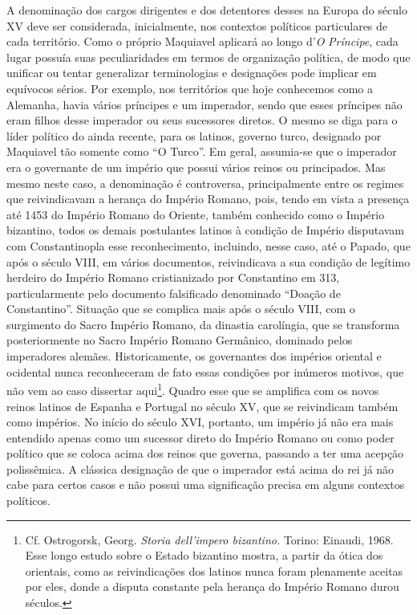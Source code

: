 A denominação dos cargos dirigentes e dos detentores desses na Europa do
século XV deve ser considerada, inicialmente, nos contextos políticos
particulares de cada território. Como o próprio Maquiavel aplicará ao
longo d'\emph{O} \emph{Príncipe}, cada lugar possuía suas peculiaridades
em termos de organização política, de modo que unificar ou tentar
generalizar terminologias e designações pode implicar em equívocos
sérios. Por exemplo, nos territórios que hoje conhecemos como a
Alemanha, havia vários príncipes e um imperador, sendo que esses
príncipes não eram filhos desse imperador ou seus sucessores diretos. O
mesmo se diga para o líder político do ainda recente, para os latinos,
governo turco, designado por Maquiavel tão somente como ``O Turco''. Em
geral, assumia-se que o imperador era o governante de um império que
possui vários reinos ou principados. Mas mesmo neste caso, a denominação
é controversa, principalmente entre os regimes que reivindicavam a
herança do Império Romano, pois, tendo em vista a presença até 1453 do
Império Romano do Oriente, também conhecido como o Império bizantino,
todos os demais postulantes latinos à condição de Império disputavam com
Constantinopla esse reconhecimento, incluindo, nesse caso, até o Papado,
que após o século VIII, em vários documentos, reivindicava a sua
condição de legítimo herdeiro do Império Romano cristianizado por
Constantino em 313, particularmente pelo documento falsificado
denominado ``Doação de Constantino''. Situação que se complica mais após
o século VIII, com o surgimento do Sacro Império Romano, da dinastia
carolíngia, que se transforma posteriormente no Sacro Império Romano
Germânico, dominado pelos imperadores alemães. Historicamente, os
governantes dos impérios oriental e ocidental nunca reconheceram de fato
essas condições por inúmeros motivos, que não vem ao caso dissertar
aqui\footnote{Cf. Ostrogorsk, Georg. \emph{Storia dell'impero
  bizantino.} Torino: Einaudi, 1968. Esse longo estudo sobre o Estado
  bizantino mostra, a partir da ótica dos orientais, como as
  reivindicações dos latinos nunca foram plenamente aceitas por eles,
  donde a disputa constante pela herança do Império Romano durou
  séculos.}. Quadro esse que se amplifica com os novos reinos latinos de
Espanha e Portugal no século XV, que se reivindicam também como
impérios. No início do século XVI, portanto, um império já não era mais
entendido apenas como um sucessor direto do Império Romano ou como poder
político que se coloca acima dos reinos que governa, passando a ter uma
acepção polissêmica. A clássica designação de que o imperador está acima
do rei já não cabe para certos casos e não possui uma significação
precisa em alguns contextos políticos.

